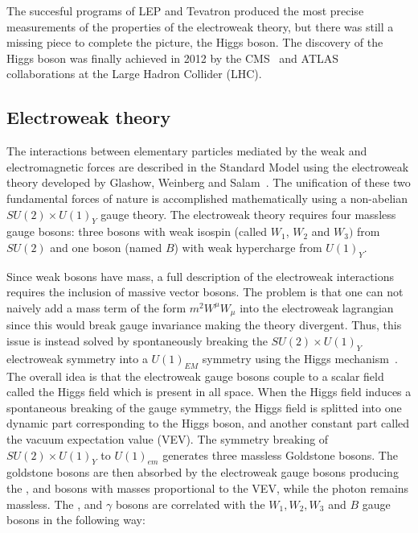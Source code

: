 The succesful programs of LEP and Tevatron produced the most precise measurements of the properties of the electroweak theory, but there was still a missing piece to complete the picture, the Higgs boson. The discovery of the Higgs boson was finally achieved in 2012 by the CMS~\cite{HiggsBoson_CMS} and ATLAS~\cite{HiggsBoson_ATLAS} collaborations at the Large Hadron Collider (LHC).


\subsection{Electroweak theory}

The interactions between elementary particles mediated by the weak and electromagnetic forces are described in the Standard Model using the electroweak theory developed by Glashow, Weinberg and Salam~\cite{Glashow:1959wxa,Weinberg:1967tq,Salam:1968rm}. The unification of these two fundamental forces of nature is accomplished mathematically using a non-abelian $SU(2) \times U(1)_{Y}$ gauge theory. The electroweak theory requires four massless gauge bosons: three bosons with weak isospin (called $W_{1}$, $W_{2}$ and $W_{3})$ from $SU(2)$ and one boson (named $B$) with weak hypercharge from $U(1)_{Y}$.

Since weak bosons have mass, a full description of the electroweak interactions requires the inclusion of massive vector bosons. The problem is that one can not naively add a mass term of the form $m^{2}W^{\mu}W_{\mu}$ into the electroweak lagrangian since this would break gauge invariance making the theory divergent. Thus, this issue is instead solved by spontaneously breaking the $SU(2) \times U(1)_{Y}$ electroweak symmetry into a $U(1)_{EM}$ symmetry using the Higgs mechanism~\cite{HiggsMechanism_1,HiggsMechanism_2}. The overall idea is that the electroweak gauge bosons couple to a scalar field called the Higgs field which is present in all space. When the Higgs field induces a spontaneous breaking of the gauge symmetry, the Higgs field is splitted into one dynamic part corresponding to the Higgs boson, and another constant part called the vacuum expectation value (VEV). The symmetry breaking of $SU(2) \times U(1)_{Y}$ to $U(1)_{em}$ generates three massless Goldstone bosons. The goldstone bosons are then absorbed by the electroweak gauge bosons producing the \Wp, \Wm and \Z bosons with masses proportional to the VEV, while the photon remains massless. The \Wpm, \Z and $\gamma$ bosons are correlated with the $W_{1}, W_{2}, W_{3}$ and $B$ gauge bosons in the following way:

